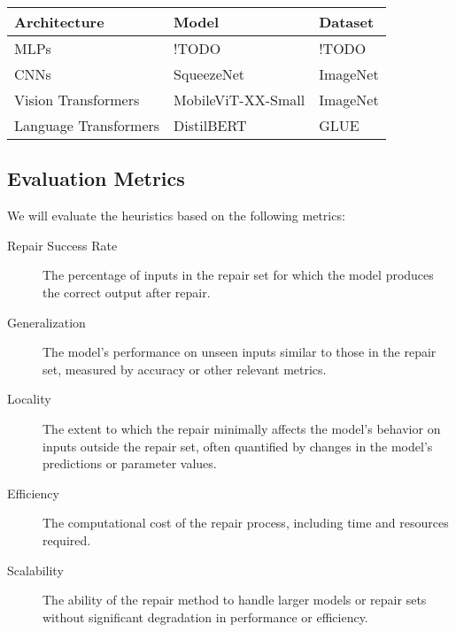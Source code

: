 \documentclass{article}
\begin{document}
\begin{longtable}{p{} p{} p{}}
	\toprule
	\textbf{Architecture} & \textbf{Model}                      & \textbf{Dataset}         \\
	\midrule
	\endhead
	\bottomrule
	\endfoot
	\bottomrule
	\endlastfoot
	MLPs                  & !TODO                               & !TODO                    \\
	\midrule
	CNNs                  & SqueezeNet \cite{squeezenet}        & ImageNet \cite{imagenet} \\
	\midrule
	Vision Transformers   & MobileViT-XX-Small \cite{mobilevit} & ImageNet \cite{imagenet} \\
	\midrule
	Language Transformers & DistilBERT \cite{distilbert}        & GLUE \cite{GLUE}         \\
\end{longtable}

\subsection{Evaluation Metrics}
We will evaluate the heuristics based on the following metrics:
\begin{description}
	\item[Repair Success Rate] The percentage of inputs in the repair set for which the model produces the correct output after repair.
	\item[Generalization] The model's performance on unseen inputs similar to those in the repair set, measured by accuracy or other relevant metrics.
	\item[Locality] The extent to which the repair minimally affects the model's behavior on inputs outside the repair set, often quantified by changes in the model's predictions or parameter values.
	\item[Efficiency] The computational cost of the repair process, including time and resources required.
	\item[Scalability] The ability of the repair method to handle larger models or repair sets without significant degradation in performance or efficiency.
\end{description}



\end{document}
